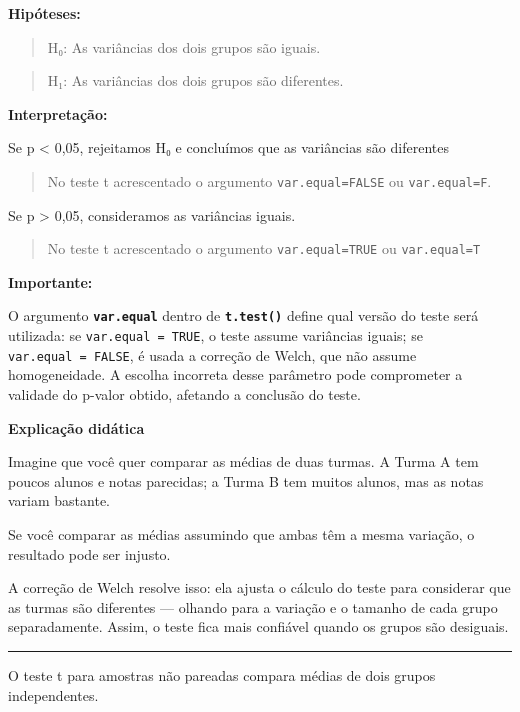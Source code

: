 \documentclass[
]{book}
\begin{document}
\textbf{Hipóteses:}

\begin{quote}
H₀: As variâncias dos dois grupos são iguais.
\end{quote}

\begin{quote}
H₁: As variâncias dos dois grupos são diferentes.
\end{quote}

\textbf{Interpretação:}

Se p \textless{} 0,05, rejeitamos H₀ e concluímos que as variâncias são diferentes

\begin{quote}
No teste t acrescentado o argumento \texttt{var.equal=FALSE} ou \texttt{var.equal=F}.
\end{quote}

Se p \textgreater{} 0,05, consideramos as variâncias iguais.

\begin{quote}
No teste t acrescentado o argumento \texttt{var.equal=TRUE} ou \texttt{var.equal=T}
\end{quote}

\textbf{Importante:}

O argumento \textbf{\texttt{var.equal}} dentro de \textbf{\texttt{t.test()}} define qual versão do teste será utilizada: se \texttt{var.equal\ =\ TRUE}, o teste assume variâncias iguais; se \texttt{var.equal\ =\ FALSE}, é usada a correção de Welch, que não assume homogeneidade. A escolha incorreta desse parâmetro pode comprometer a validade do p-valor obtido, afetando a conclusão do teste.

\textbf{Explicação didática}

Imagine que você quer comparar as médias de duas turmas. A Turma A tem poucos alunos e notas parecidas; a Turma B tem muitos alunos, mas as notas variam bastante.

Se você comparar as médias assumindo que ambas têm a mesma variação, o resultado pode ser injusto.

A correção de Welch resolve isso: ela ajusta o cálculo do teste para considerar que as turmas são diferentes --- olhando para a variação e o tamanho de cada grupo separadamente. Assim, o teste fica mais confiável quando os grupos são desiguais.

\begin{center}\rule{0.5\linewidth}{0.5pt}\end{center}

O teste t para amostras não pareadas compara médias de dois grupos independentes.
\end{document}
